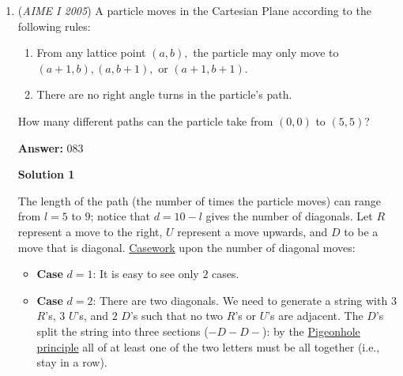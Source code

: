 \begin{enumerate}
We list out $S(1), S(2)...$ and find that there is a pattern. $S(1-3)=odd$,$S(4-8)=even$,$S(9-15)=odd$, and so on. We observe that the groupings of odd sums and even sums are broken up at every odd number. In that case, we need to find when the sequence $3,5,7,9...$ has a sum greater than $2005$. We test values and find that $89$ is the greatest value in the sequence. At $89$, the sum will be $2024$. At $89$, the sequence will have an odd number of terms, and therefore the $89$ terms will be even. This means that $S(1935-2024)=even$; however, we only care about $1935-2005$. These are $70$ even sums; we can add $70$ after finding the number of even sums less than or equal to $1935$, which is the sum of the sequence, $5,9,13, 13,\dots, 85$. The sum of this sequence is $945$; we add $70$ to find that there are $945+70=1015$ even sums. This means there are $990$ odd sums. $|990-1015|=\boxed{25}$.~jamespudi

 


	\item (\textit{AIME I 2005}) A particle moves in the Cartesian Plane according to the following rules:


 
            \begin{enumerate}
        \item From any lattice point $(a,b),$ the particle may only move to $(a+1,b), (a,b+1),$ or $(a+1,b+1).$

        \item There are no right angle turns in the particle's path.
            \end{enumerate}
            How many different paths can the particle take from $(0,0)$ to $(5,5)$?


 
 \textbf{Answer: }083



\textbf{Solution 1}

The length of the path (the number of times the particle moves) can range from $l = 5$ to $9$; notice that $d = 10-l$ gives the number of diagonals. Let $R$ represent a move to the right, $U$ represent a move upwards, and $D$ to be a move that is diagonal. \href{https://artofproblemsolving.com/wiki/index.php?title=Casework}{Casework} upon the number of diagonal moves:

 
            \begin{itemize}
        \item \textbf{Case } $d = 1$: It is easy to see only $2$ cases.
        \item \textbf{Case } $d = 2$: There are two diagonals. We need to generate a string with $3$ $R$'s, $3$ $U$'s, and $2$ $D$'s such that no two $R$'s or $U$'s are adjacent. The $D$'s split the string into three sections ($-D-D-$): by the \href{https://artofproblemsolving.com/wiki/index.php?title=Pigeonhole\_principle}{Pigeonhole principle} all of at least one of the two letters must be all together (i.e., stay in a row).
            \end{itemize}
            

\end{enumerate}
